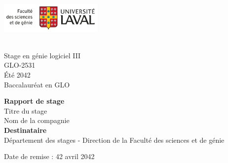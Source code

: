 \documentclass[12pt]{article} 	%
\newcommand\titreDuCours{Stage en génie logiciel III}
\newcommand\sigleCoursStage{GLO-2531}
\newcommand\session{Été 2042}
\newcommand\acronymeDuBac{GLO}
\newcommand\titreStage{Titre du stage}
\newcommand\nomCompagnie{Nom de la compagnie}
\newcommand\dateRemise{42 avril 2042}
\newcommand\distanceEnteteEtNomStage{4cm}
\newcommand\distanceTypeRapportEtDestinataire{5cm}
\begin{document}
\thispagestyle{empty}
\begin{minipage}[t]{8.5cm}
    \vspace{0pt}
    \begin{flushleft}
        \hspace{-1cm}\includegraphics[width=5cm]{img/UL-FSG-C-g-3lignes.png}\\
    \end{flushleft}
\end{minipage}
\begin{minipage}[t]{8.5cm}
    \begin{flushright}
        \hspace*{2cm} \\
        \hspace*{1cm}\titreDuCours\\
        \hspace*{1cm}\sigleCoursStage\\
        \hspace*{1cm}\session\\
        \hspace*{1cm}Baccalauréat en {\acronymeDuBac}\\
    \end{flushright}
\end{minipage}

\vspace{\distanceEnteteEtNomStage}
\begin{center}
    
    \fontsize{14.4}{14.4}\large \textbf{Rapport de stage}\\
    \vspace{1cm}
    \large {\titreStage}  \\
\vspace{0.2cm}
    {\nomCompagnie} \\
    \vspace{\distanceTypeRapportEtDestinataire}
    \fontsize{14.4}{14.4}\textbf {Destinataire}\\
    \large Département des stages  - Direction de la Faculté des sciences et de génie \\
\end{center}
\vspace{2cm}
\begin{flushleft}
    Date de remise : {\dateRemise}
\end{flushleft}
\end{document}
